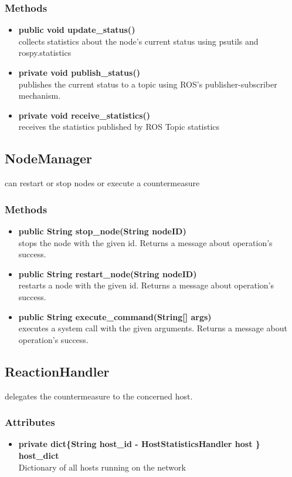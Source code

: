 \subsubsection{Methods}
\begin{itemize}
	\item \textbf{public void update\_status()}\\
	collects statistics about the node's current status using psutils and rospy.statistics
	\item \textbf{private void publish\_status()}\\
	publishes the current status to a topic using ROS's publisher-subscriber mechanism.
	\item \textbf{private void receive\_statistics()}\\
	receives the statistics published by ROS Topic statistics
\end{itemize}

\subsection{NodeManager}
can restart or stop nodes or execute a countermeasure 

\subsubsection{Methods}
\begin{itemize}
	\item \textbf{public String stop\_node(String nodeID)}\\
	stops the node with the given id.
	Returns a message about operation's success.
	\item \textbf{public String restart\_node(String nodeID)}\\
	restarts a node with the given id.
	Returns a message about operation's success.
	\item \textbf{public String execute\_command(String[] args)}\\
	executes a system call with the given arguments.
	Returns a message about operation's success.
\end{itemize}

\subsection{ReactionHandler}
delegates the countermeasure to the concerned host.

\subsubsection{Attributes}
\begin{itemize}
	\item \textbf{private  dict\{String host\_id  - HostStatisticsHandler host  \} host\_dict}\\
	Dictionary of all hosts running on the network
\end{itemize}

